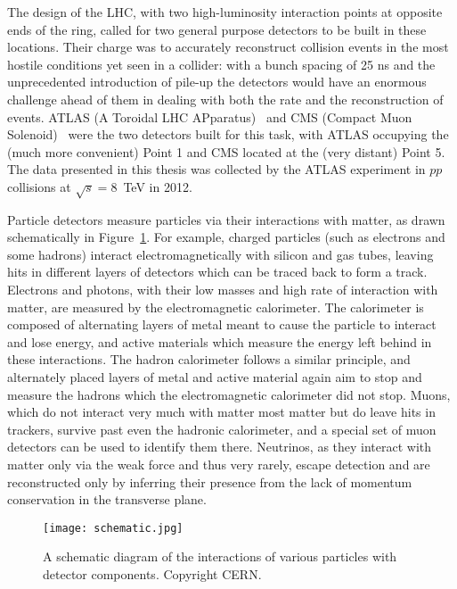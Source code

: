 \label{chapter:detector}

The design of the LHC, with two high-luminosity interaction points at opposite ends of the ring, called for two general purpose detectors to be built in these locations. Their charge was to accurately reconstruct collision events in the most hostile conditions yet seen in a collider: with a bunch spacing of 25 ns and the unprecedented introduction of pile-up the detectors would have an enormous challenge ahead of them in dealing with both the rate and the reconstruction of events. ATLAS (A Toroidal LHC APparatus)~\cite{ATLASPaper} and CMS (Compact Muon Solenoid)~\cite{CMSPaper} were the two detectors built for this task, with ATLAS occupying the (much more convenient) Point 1 and CMS located at the (very distant) Point 5. The data presented in this thesis was collected by the ATLAS experiment in $pp$ collisions at $\sqrt{s} = 8$~TeV in 2012. 




Particle detectors measure particles via their interactions with matter, as drawn schematically in Figure~\ref{fig:detector:schematic}. For example, charged particles (such as electrons and some hadrons) interact electromagnetically with silicon and gas tubes, leaving hits in different layers of detectors which can be traced back to form a track. Electrons and photons, with their low masses and high rate of interaction with matter, are measured by the electromagnetic calorimeter. The calorimeter is composed of alternating layers of metal meant to cause the particle to interact and lose energy, and active materials which measure the energy left behind in these interactions. The hadron calorimeter follows a similar principle, and alternately placed layers of metal and active material again aim to stop and measure the hadrons which the electromagnetic calorimeter did not stop. Muons, which do not interact very much with matter most matter but do leave hits in trackers, survive past even the hadronic calorimeter, and a special set of muon detectors can be used to identify them there. Neutrinos, as they interact with matter only via the weak force and thus very rarely, escape detection and are reconstructed only by inferring their presence from the lack of momentum conservation in the transverse plane. 



\begin{figure}
\centering
\texttt{[image: schematic.jpg]}
\label{fig:detector:schematic}
\caption{A schematic diagram of the interactions of various particles with detector components. Copyright CERN.}
\end{figure}

